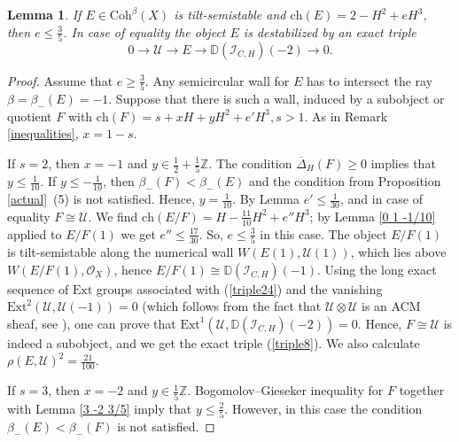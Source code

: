 \documentclass{amsart}
\newtheorem{lemma}[theorem]{Lemma}
\begin{document}
	\begin{lemma}
		\label{2 0 -1} If $E\in\mathrm{Coh}^\beta(X)$ is tilt-semistable and $\mathrm{ch}(E)=2-H^2+eH^3$, then $e\le\frac 35$. In case of equality the object $E$ is destabilized by an exact triple
		\begin{equation}\label{triple8}0\to\mathcal U\to E\to \mathbb D(\mathcal I_{C,H})(-2)\to 0.\end{equation}
	\end{lemma}
	
	\begin{proof}Assume that $e\ge\frac 35$. Any semicircular wall for $E$ has to intersect the ray $\beta=\beta_-(E)=-1$. Suppose that there is such a wall, induced by a subobject or quotient $F$ with $\mathrm{ch}(F)=s+xH+yH^2+e'H^3,s>1$. As in Remark \ref{inequalities}, $x=1-s$.
		
		If $s=2$, then $x=-1$ and $y\in\frac 12+\frac 15\mathbb Z$. The condition $\overline{\Delta}_H(F)\ge 0$ implies that $y\le\frac{1}{10}$. If $y\le-\frac{1}{10}$, then $\beta_-(F)<\beta_-(E)$ and the condition from Proposition \ref{actual}~(5) is not satisfied. Hence, $y=\frac{1}{10}$. By Lemma \cite[Lemma 3.6]{Vass} $e'\le\frac{1}{30}$, and in case of equality $F\cong\mathcal U$. We find $\mathrm{ch}(E/F)=H-\frac{11}{10}H^2+e''H^3$; by Lemma \ref{0 1 -1/10} applied to $E/F(1)$ we get $e''\le\frac{17}{30}$. So, $e\le\frac 35$ in this case. The object $E/F(1)$ is tilt-semistable along the numerical wall $W(E(1),\mathcal U(1))$, which lies above $W(E/F(1),\mathcal O_X)$, hence $E/F(1)\cong \mathbb D(\mathcal I_{C,H})(-1)$. Using the long exact sequence of $\mathrm{Ext}$ groups associated with (\ref{triple24}) and the vanishing $\mathrm{Ext}^2(\mathcal U,\mathcal U(-1))=0$ (which follows from the fact that $\mathcal U\otimes\mathcal U$ is an ACM sheaf, see \cite[proof of Proposition 5.6]{Faenzi}), one can prove that $\mathrm{Ext}^1(\mathcal U,\mathbb D(\mathcal I_{C,H})(-2))=0$. Hence, $F\cong\mathcal U$ is indeed a subobject, and we get the exact triple (\ref{triple8}). We also calculate $\rho(E,\mathcal U)^2=\frac{21}{100}$.
		
		If $s=3$, then $x=-2$ and $y\in\frac 15\mathbb Z$. Bogomolov--Gieseker inequality for $F$ together with Lemma \ref{3 -2 3/5} imply that $y\le\frac 25$. However, in this case the condition $\beta_-(E)<\beta_-(F)$ is not satisfied. 
		

\end{proof}
\end{document}
